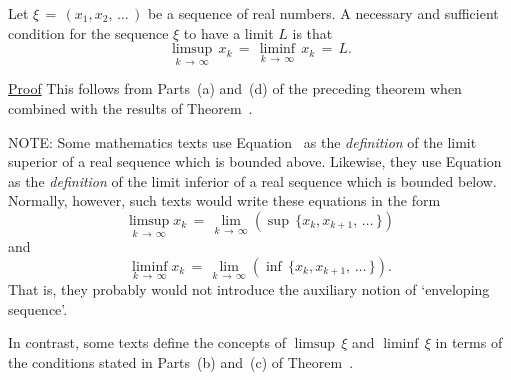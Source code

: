         Let ${\xi} \,=\, (x_{1},x_{2},\,{\ldots}\,)$ be a sequence of real numbers.
    A necessary and sufficient condition for the sequence ${\xi}$ to have a limit $L$ is that
        \begin{displaymath}
        {\limsup}_{k \,{\rightarrow}\, {\infty}}\,x_{k} \,=\, {\liminf}_{k \,{\rightarrow}\, {\infty}}\, x_{k} \,=\, L.
        \end{displaymath}


        \underline{Proof} This follows from Parts~(a) and~(d) of the preceding theorem when combined with the results of Theorem~.


\V

        NOTE: Some mathematics texts use Equation~ as the {\em definition} of the limit superior of a real sequence which is bounded above.
    Likewise, they use Equation~ as the {\em definition} of the limit inferior of a real sequence which is bounded below.
    Normally, however, such texts would write these equations in the form
        \begin{displaymath}
        \limsup_{k \,{\rightarrow}\, {\infty}} x_{k} \,=\, \lim_{k \,{\rightarrow}\, {\infty}} \left({\sup}\,\{x_{k},x_{k+1},\,{\ldots}\,\}\right)
        \end{displaymath}
    and
        \begin{displaymath}
        \liminf_{k \,{\rightarrow}\, {\infty}} x_{k} \,=\, \lim_{k \,{\rightarrow}\, {\infty}} \left({\inf}\,\{x_{k},x_{k+1},\,{\ldots}\,\}\right). 
        \end{displaymath}
    That is, they probably would not introduce the auxiliary notion of `enveloping sequence'.

        In contrast, some texts define the concepts of ${\limsup\, {\xi}}$ and $\liminf\, {\xi}$ in terms of the conditions stated in Parts~(b) and~(c) of Theorem~.

\V
\V

